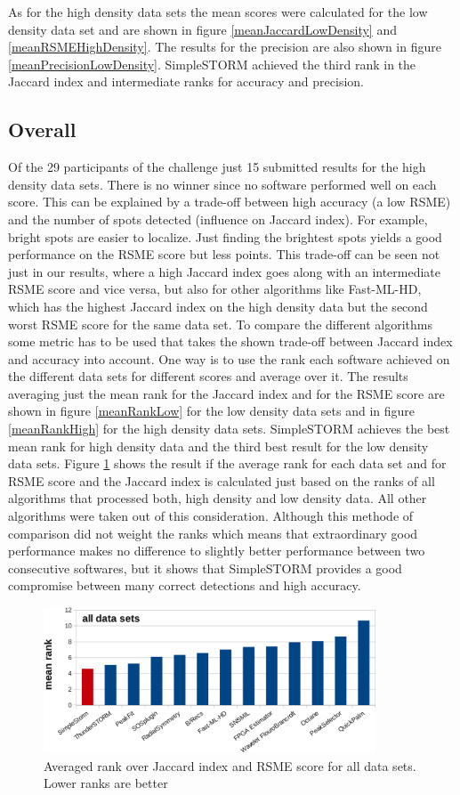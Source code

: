 As for the high density data sets the mean scores were calculated for the low density data set and are shown in figure \ref{meanJaccardLowDensity} and \ref{meanRSMEHighDensity}. The results for the precision are also shown in figure \ref{meanPrecisionLowDensity}. SimpleSTORM achieved the third rank in the Jaccard index and intermediate ranks for accuracy and precision.



\subsection{Overall}
Of the 29 participants of the challenge just 15 submitted results for the high density data sets. There is no winner since no software performed well on each score. This can be explained by a trade-off between high accuracy (a low RSME) and the number of spots detected (influence on Jaccard index). For example, bright spots are easier to localize. Just finding the brightest spots yields a good performance on the RSME score but less points. This trade-off can be seen not just in our results, where a high Jaccard index goes along with an intermediate RSME score and vice versa, but also for other algorithms like Fast-ML-HD, which has the highest Jaccard index on the high density data but the second worst RSME score for the same data set.\newline
To compare the different algorithms some metric has to be used that takes the shown trade-off between Jaccard index and accuracy into account. One way is to use the rank each software achieved on the different data sets for different scores and average over it. The results averaging just the mean rank for the Jaccard index and for the RSME score are shown in figure \ref{meanRankLow} for the low density data sets and in figure \ref{meanRankHigh} for the high density data sets.\newline
SimpleSTORM achieves the best mean rank for high density data and the third best result for the low density data sets. \newline
Figure \ref{meanRankOverall} shows the result if the average rank for each data set and for RSME score and the Jaccard index is calculated just based on the ranks of all algorithms that processed both, high density and low density data. All other algorithms were taken out of this consideration. Although this methode of comparison did not weight the ranks which means that extraordinary good performance makes no difference to slightly better performance between two consecutive softwares, but it shows that SimpleSTORM provides a good compromise between many correct detections and high accuracy.



\begin{figure}
\centering
\includegraphics[width = 0.88\textwidth]{pictures/diagrammsChallenge/MeanRankOverallCropped.pdf}
	\caption{Averaged rank over Jaccard index and RSME score for all data sets. Lower ranks are better}
	\label{meanRankOverall}
\end{figure}